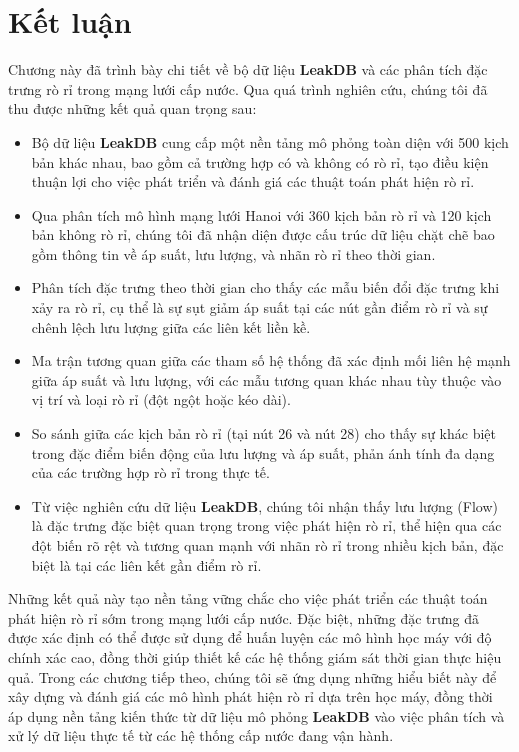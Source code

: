 \section{Kết luận}

Chương này đã trình bày chi tiết về bộ dữ liệu \textbf{LeakDB} và các phân tích đặc trưng rò rỉ trong mạng lưới cấp nước. Qua quá trình nghiên cứu, chúng tôi đã thu được những kết quả quan trọng sau:

\begin{itemize}
    \item Bộ dữ liệu \textbf{LeakDB} cung cấp một nền tảng mô phỏng toàn diện với 500 kịch bản khác nhau, bao gồm cả trường hợp có và không có rò rỉ, tạo điều kiện thuận lợi cho việc phát triển và đánh giá các thuật toán phát hiện rò rỉ.
    
    \item Qua phân tích mô hình mạng lưới Hanoi với 360 kịch bản rò rỉ và 120 kịch bản không rò rỉ, chúng tôi đã nhận diện được cấu trúc dữ liệu chặt chẽ bao gồm thông tin về áp suất, lưu lượng, và nhãn rò rỉ theo thời gian.
    
    \item Phân tích đặc trưng theo thời gian cho thấy các mẫu biến đổi đặc trưng khi xảy ra rò rỉ, cụ thể là sự sụt giảm áp suất tại các nút gần điểm rò rỉ và sự chênh lệch lưu lượng giữa các liên kết liền kề.
    
    \item Ma trận tương quan giữa các tham số hệ thống đã xác định mối liên hệ mạnh giữa áp suất và lưu lượng, với các mẫu tương quan khác nhau tùy thuộc vào vị trí và loại rò rỉ (đột ngột hoặc kéo dài).
    
    \item So sánh giữa các kịch bản rò rỉ (tại nút 26 và nút 28) cho thấy sự khác biệt trong đặc điểm biến động của lưu lượng và áp suất, phản ánh tính đa dạng của các trường hợp rò rỉ trong thực tế.
    
    \item Từ việc nghiên cứu dữ liệu \textbf{LeakDB}, chúng tôi nhận thấy lưu lượng (Flow) là đặc trưng đặc biệt quan trọng trong việc phát hiện rò rỉ, thể hiện qua các đột biến rõ rệt và tương quan mạnh với nhãn rò rỉ trong nhiều kịch bản, đặc biệt là tại các liên kết gần điểm rò rỉ.
\end{itemize}

Những kết quả này tạo nền tảng vững chắc cho việc phát triển các thuật toán phát hiện rò rỉ sớm trong mạng lưới cấp nước. Đặc biệt, những đặc trưng đã được xác định có thể được sử dụng để huấn luyện các mô hình học máy với độ chính xác cao, đồng thời giúp thiết kế các hệ thống giám sát thời gian thực hiệu quả. Trong các chương tiếp theo, chúng tôi sẽ ứng dụng những hiểu biết này để xây dựng và đánh giá các mô hình phát hiện rò rỉ dựa trên học máy, đồng thời áp dụng nền tảng kiến thức từ dữ liệu mô phỏng \textbf{LeakDB} vào việc phân tích và xử lý dữ liệu thực tế từ các hệ thống cấp nước đang vận hành.

